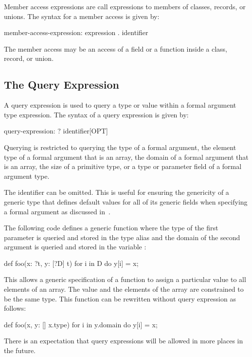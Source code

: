 Member access expressions are call expressions to members of classes,
records, or unions.  The syntax for a member access is given by:
\begin{syntax}
member-access-expression:
  expression . identifier
\end{syntax}
The member access may be an access of a field or a function inside a
class, record, or union.

\subsection{The Query Expression}
\label{The_Query_Expression}

A query expression is used to query a type or value within a formal
argument type expression.  The syntax of a query expression is given
by:
\begin{syntax}
query-expression:
  ? identifier[OPT]
\end{syntax}
Querying is restricted to querying the type of a formal argument, the
element type of a formal argument that is an array, the domain of a
formal argument that is an array, the size of a primitive type, or a
type or parameter field of a formal argument type.

The identifier can be omitted.  This is useful for ensuring the
genericity of a generic type that defines default values for all of
its generic fields when specifying a formal argument as discussed
in~.

\begin{example}
The following code defines a generic function where the type of the
first parameter is queried and stored in the type alias  and
the domain of the second argument is queried and stored in the
variable :
\begin{chapel}
def foo(x: ?t, y: [?D] t) {
  for i in D do
    y[i] = x;
}
\end{chapel}
This allows a generic specification of a function to assign a
particular value to all elements of an array.  The value and the
elements of the array are constrained to be the same type.  This
function can be rewritten without query expression as follows:
\begin{chapel}
def foo(x, y: [] x.type) {
  for i in y.domain do
    y[i] = x;
}
\end{chapel}
\end{example}

There is an expectation that query expressions will be allowed in more
places in the future.


